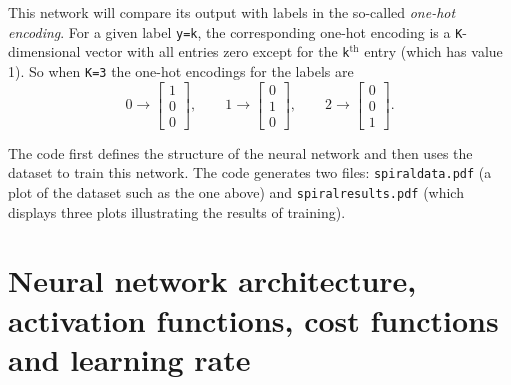 \documentclass[letterpaper]{scrartcl}
\begin{document}
This network will compare its output with labels in the so-called \emph{one-hot encoding}.
For a given label \texttt{y=k}, the corresponding one-hot encoding is a \texttt{K}-dimensional vector with all entries zero 
except for the \texttt{k}$^\text{th}$ entry (which has value 1).
So when \texttt{K=3} the one-hot encodings for the labels are
\begin{equation*}
0 \rightarrow \begin{bmatrix} 1 \\ 0 \\ 0 \end{bmatrix}, \qquad
1 \rightarrow \begin{bmatrix} 0 \\ 1 \\ 0 \end{bmatrix}, \qquad
2 \rightarrow \begin{bmatrix} 0 \\ 0 \\ 1 \end{bmatrix}.
\end{equation*}

The code first defines the structure of the neural network 
and then uses the dataset to train this network.
The code generates two files: \texttt{spiral{\textunderscore}data.pdf} (a plot of the dataset such as the one above)
and \texttt{spiral{\textunderscore}results.pdf} (which displays three plots illustrating the results of training).

\section{Neural network architecture, activation functions, cost functions and learning rate}

\end{document}
